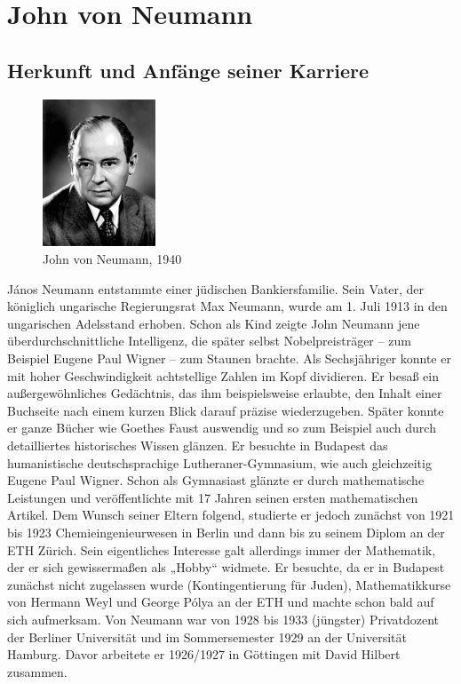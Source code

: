 
\chapter{John von Neumann}
\section{Herkunft und Anfänge seiner Karriere}

\begin{figure}[ht]
\includegraphics[width=0.3\textwidth]{jvn.png}
\caption{John von Neumann, 1940}
\end{figure}
János Neumann entstammte einer jüdischen Bankiersfamilie. Sein Vater, der königlich ungarische Regierungsrat Max Neumann, wurde am 1. Juli 1913 in den ungarischen Adelsstand erhoben. Schon als Kind zeigte John Neumann jene überdurchschnittliche Intelligenz, die später selbst Nobelpreisträger – zum Beispiel Eugene Paul Wigner – zum Staunen brachte. Als Sechsjähriger konnte er mit hoher Geschwindigkeit achtstellige Zahlen im Kopf dividieren. Er besaß ein außergewöhnliches Gedächtnis, das ihm beispielsweise erlaubte, den Inhalt einer Buchseite nach einem kurzen Blick darauf präzise wiederzugeben. Später konnte er ganze Bücher wie Goethes Faust auswendig und so zum Beispiel auch durch detailliertes historisches Wissen glänzen. Er besuchte in Budapest das humanistische deutschsprachige Lutheraner-Gymnasium, wie auch gleichzeitig Eugene Paul Wigner. Schon als Gymnasiast glänzte er durch mathematische Leistungen und veröffentlichte mit 17 Jahren seinen ersten mathematischen Artikel. Dem Wunsch seiner Eltern folgend, studierte er jedoch zunächst von 1921 bis 1923 Chemieingenieurwesen in Berlin und dann bis zu seinem Diplom an der ETH Zürich. Sein eigentliches Interesse galt allerdings immer der Mathematik, der er sich gewissermaßen als „Hobby“ widmete. Er besuchte, da er in Budapest zunächst nicht zugelassen wurde (Kontingentierung für Juden), Mathematikkurse von Hermann Weyl und George Pólya an der ETH und machte schon bald auf sich aufmerksam. Von Neumann war von 1928 bis 1933 (jüngster) Privatdozent der Berliner Universität und im Sommersemester 1929 an der Universität Hamburg. Davor arbeitete er 1926/1927 in Göttingen mit David Hilbert zusammen.

